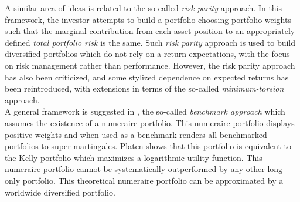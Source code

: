 A similar area of ideas is related to the so-called {\it risk-parity} approach. In this framework, the investor attempts to build a portfolio choosing  portfolio weights such that the marginal contribution from each asset position  to an appropriately defined {\it total  portfolio risk} is the same.
Such {\it risk parity} approach is used to build diversified portfolios which do not rely on a return expectations, with the focus on risk management rather than performance. However, the  risk parity approach has also been  criticized, and some stylized dependence on expected returns has been  reintroduced, with extensions in terms of the so-called {\it minimum-torsion} approach.\\
 
A general framework is suggested in \cite{Platen2009}, the so-called {\it benchmark approach} which assumes the existence of a numeraire portfolio. This numeraire portfolio displays positive weights and when used as a benchmark renders all benchmarked portfolios to super-martingales. Platen shows that this portfolio is equivalent to the Kelly portfolio which maximizes a logarithmic utility function. This numeraire portfolio cannot be systematically outperformed by any other long-only portfolio. This theoretical numeraire portfolio can be approximated by a worldwide diversified portfolio. 
 
 






